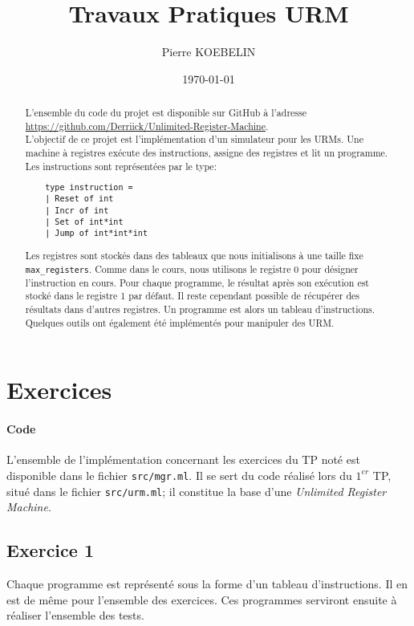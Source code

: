 \documentclass[11pt, a4paper, twoside, titlepage]{article}
\begin{document}
\title{{\titlefont Travaux Pratiques URM}}
\author{Pierre KOEBELIN}
\date{\today}
\maketitle

\begin{abstract}
L'ensemble du code du projet est disponible sur GitHub à l'adresse \url{https://github.com/Derriick/Unlimited-Register-Machine}.\\
L'objectif de ce projet est l'implémentation d'un simulateur pour les URMs. Une machine à registres exécute des instructions, assigne des registres et lit un programme. Les instructions sont représentées par le type:
\begin{lstlisting}
	type instruction =
	| Reset of int
	| Incr of int
	| Set of int*int
	| Jump of int*int*int
\end{lstlisting}
Les registres sont stockés dans des tableaux que nous initialisons à une taille fixe \texttt{max\_registers}. Comme dans le cours, nous utilisons le registre 0 pour désigner l’instruction en cours. Pour chaque programme, le résultat après son exécution est stocké dans le registre 1 par défaut. Il reste cependant possible de récupérer des résultats dans d'autres registres. Un programme est alors un tableau d’instructions.\\
Quelques outils ont également été implémentés pour manipuler des URM.
\end{abstract}

\tableofcontents

\newpage
\section{Exercices}
\paragraph{Code}
L'ensemble de l'implémentation concernant les exercices du TP noté est disponible dans le fichier \texttt{src/mgr.ml}. Il se sert du code réalisé lors du $1^{er}$ TP, situé dans le fichier \texttt{src/urm.ml}; il constitue la base d'une \textit{Unlimited Register Machine}.

\subsection{Exercice 1}
Chaque programme est représenté sous la forme d'un tableau d'instructions. Il en est de même pour l'ensemble des exercices. Ces programmes serviront ensuite à réaliser l'ensemble des tests.
\end{document}
